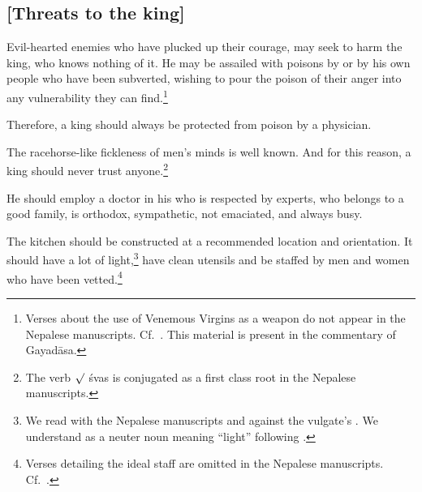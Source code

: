 \begin{translation}
\subsection{[Threats to the king]}

\item[4--5]  

Evil-hearted enemies who have plucked up their courage, may seek to harm the king,
who knows nothing of it.  He may be assailed with poisons by or by his own people
who have been subverted, wishing to pour the poison of their anger into any
vulnerability they can find.\footnote{Verses about the use of Venemous Virgins as a weapon
do not appear in the Nepalese manuscripts. Cf.\ \cite[81\,f., 132]{wuja-2003}.  This material 
is present in the commentary of Gayadāsa.} 

\item[6] Therefore, a king should always be protected from poison by a physician.


\item [7] 

The racehorse-like fickleness of men's minds is well known. And for this reason, a
king should never trust anyone.\footnote{The verb $\surd$ śvas is conjugated as a
first class root in the Nepalese manuscripts.}

\item [8--11]

He should employ a doctor in his  who is respected by experts, who 
belongs to a good family, is orthodox, sympathetic, not emaciated, and always busy.

\item [12--13]

The kitchen should be constructed at a recommended location and orientation.  It should
have a lot of light,\footnote{We read  with the Nepalese manuscripts and 
against the vulgate's .  We understand  as a neuter noun 
meaning “light” following \citet[1050a]{apte-prac}.} have clean utensils and be staffed by 
men 
and
women who have been vetted.\footnote{Verses detailing the ideal staff are omitted in the 
Nepalese manuscripts. 
Cf.\ \cites[560]{vulgate}[132]{wuja-2003}.}



\end{translation}
